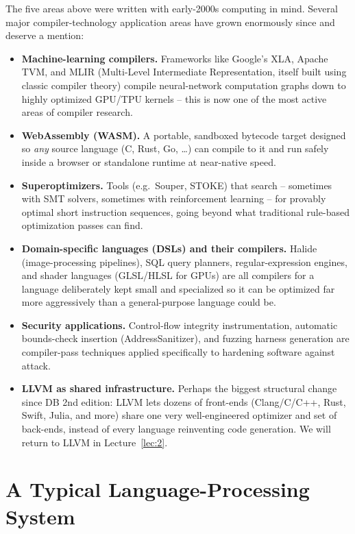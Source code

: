 \documentclass[full-course-notes.tex]{subfiles}
\begin{document}
\begin{enrichment}
The five areas above were written with early-2000s computing in mind. Several major
compiler-technology application areas have grown enormously since and deserve a mention:
\begin{itemize}
  \item \textbf{Machine-learning compilers.} Frameworks like Google's XLA, Apache TVM, and
  MLIR (Multi-Level Intermediate Representation, itself built using classic compiler theory)
  compile neural-network computation graphs down to highly optimized GPU/TPU kernels -- this is
  now one of the most active areas of compiler research.
  \item \textbf{WebAssembly (WASM).} A portable, sandboxed bytecode target designed so
  \emph{any} source language (C, Rust, Go, \dots) can compile to it and run safely inside a
  browser or standalone runtime at near-native speed.
  \item \textbf{Superoptimizers.} Tools (e.g.\ Souper, STOKE) that search -- sometimes with
  SMT solvers, sometimes with reinforcement learning -- for provably optimal short instruction
  sequences, going beyond what traditional rule-based optimization passes can find.
  \item \textbf{Domain-specific languages (DSLs) and their compilers.} Halide (image-processing
  pipelines), SQL query planners, regular-expression engines, and shader languages (GLSL/HLSL for
  GPUs) are all compilers for a language deliberately kept small and specialized so it can be
  optimized far more aggressively than a general-purpose language could be.
  \item \textbf{Security applications.} Control-flow integrity instrumentation, automatic
  bounds-check insertion (AddressSanitizer), and fuzzing harness generation are compiler-pass
  techniques applied specifically to hardening software against attack.
  \item \textbf{LLVM as shared infrastructure.} Perhaps the biggest structural change since DB
  2nd edition: LLVM lets dozens of front-ends (Clang/C/C++, Rust, Swift, Julia, and more) share
  one very well-engineered optimizer and set of back-ends, instead of every language reinventing
  code generation. We will return to LLVM in Lecture~\ref{lec:2}.
\end{itemize}
\end{enrichment}

\section{A Typical Language-Processing System}
\label{sec:l1-toolchain}
\end{document}
